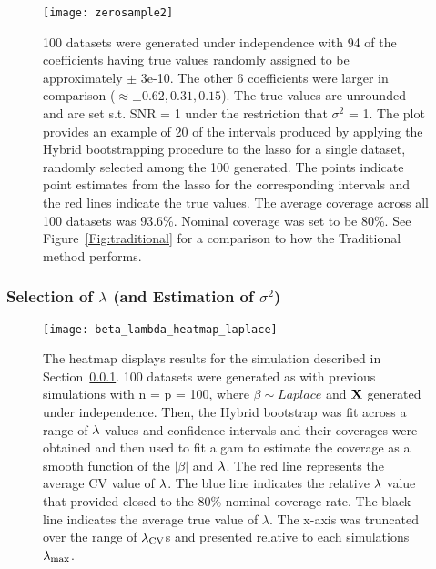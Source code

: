 \begin{figure}[hbtp]
  \begin{center}
  \texttt{[image: zerosample2]}
  \caption{\label{Fig:zerosample2} 100 datasets were generated under independence with 94 of the coefficients having true values randomly assigned to be approximately $\pm$ 3e-10. The other 6 coefficients were larger in comparison ($\approx \pm 0.62, 0.31, 0.15$). The true values are unrounded and are set s.t. SNR = 1 under the restriction that $\sigma^2$ = 1. The plot provides an example of 20 of the intervals produced by applying the Hybrid bootstrapping procedure to the lasso for a single dataset, randomly selected among the 100 generated. The points indicate point estimates from the lasso for the corresponding intervals and the red lines indicate the true values. The average coverage across all 100 datasets was 93.6\%. Nominal coverage was set to be 80\%. See Figure~\ref{Fig:traditional} for a comparison to how the Traditional method performs.}
  \end{center}
\end{figure}


\subsubsection{Selection of \texorpdfstring{$\lambda$}{lambda} (and Estimation of \texorpdfstring{$\sigma^2$}{sigma squared})}\label{Sec:lambda}

\begin{figure}[hbtp]
  \begin{center}
  \texttt{[image: beta\_lambda\_heatmap\_laplace]}
  \caption{\label{Fig:beta_lambda_heatmap_laplace} The heatmap displays results for the simulation described in Section~\ref{Sec:lambda}. 100 datasets were generated as with previous simulations with n = p = 100, where $\beta \sim Laplace$ and $\mathbf{X}$ generated under independence. Then, the Hybrid bootstrap was fit across a range of $\lambda$ values and confidence intervals and their coverages were obtained and then used to fit a gam to estimate the coverage as a smooth function of the $|\beta|$ and $\lambda$. The red line represents the average CV value of $\lambda$. The blue line indicates the relative $\lambda$ value that provided closed to the 80\% nominal coverage rate. The black line indicates the average true value of $\lambda$. The x-axis was truncated over the range of $\lambda_{\textrm{CV}}$s and presented relative to each simulations $\lambda_{\max}$.}
  \end{center}
\end{figure}

